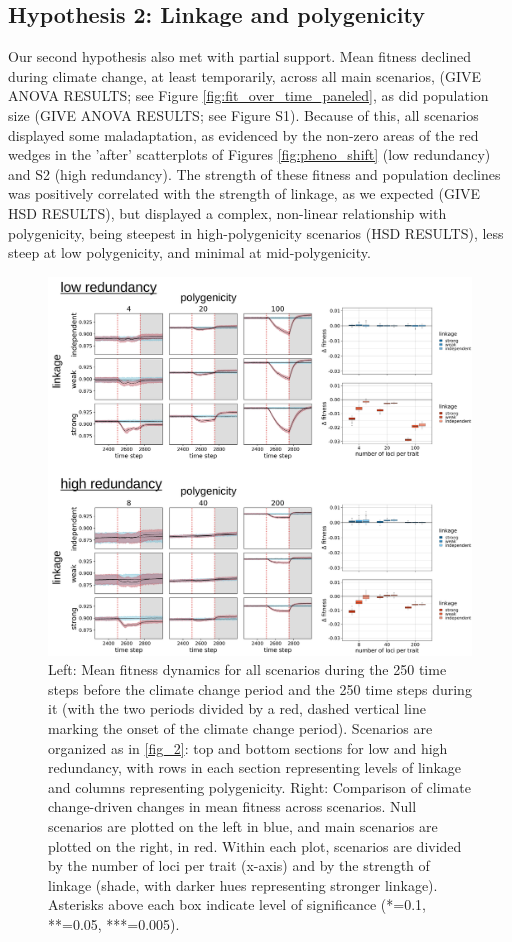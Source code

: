 \documentclass[9pt,twocolumn,twoside,lineno]{pnas-new}
\begin{document}
\subsection{Hypothesis 2: Linkage and polygenicity}
Our second hypothesis also met with partial support.
Mean fitness declined during climate change, at least temporarily, across all main scenarios, (GIVE ANOVA 
RESULTS; see Figure \ref{fig:fit_over_time_paneled}, as did population size (GIVE ANOVA 
RESULTS; see Figure S1).
Because of this, all scenarios displayed some maladaptation, as evidenced by the non-zero areas of the red wedges
in the 'after' scatterplots of Figures \ref{fig:pheno_shift} (low redundancy) and S2 (high redundancy).
The strength of these fitness and population declines was 
positively correlated with the strength of linkage, as we expected (GIVE HSD RESULTS),
but displayed a complex, non-linear relationship with polygenicity,
being steepest in high-polygenicity
scenarios (HSD RESULTS), less steep at low polygenicity, and minimal at
mid-polygenicity. 

\begin{figure}[\sidecaptionrelwidth][t]
\centering
\includegraphics[width=17.8cm]{pub/figs/FIG_3_fit_over_time.jpg}
\caption{Left: Mean fitness dynamics for all scenarios during the 250 time steps before the climate change period and the 250 time steps during it (with the two periods divided by a red, dashed vertical line marking the onset of the climate change period). Scenarios are organized as in \ref{fig_2}: top and bottom sections for low and high redundancy, with rows in each section representing levels of linkage and columns representing polygenicity. Right: Comparison of climate change-driven changes in mean fitness across scenarios. Null scenarios are plotted on the left in blue, and main scenarios are plotted on the right, in red. Within each plot, scenarios are divided by the number of loci per trait (x-axis) and by the strength of linkage (shade, with darker hues representing stronger linkage). Asterisks above each box indicate level of significance (*=0.1, **=0.05, ***=0.005).}
\label{fig:fig_3}
\end{figure}
\end{document}
